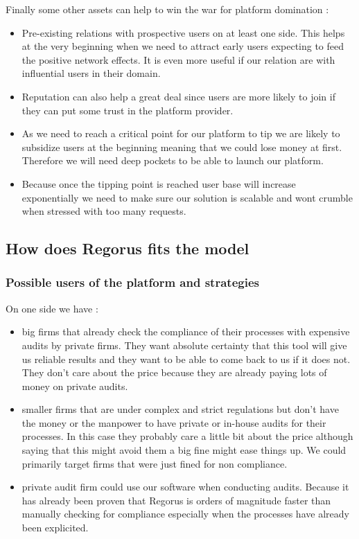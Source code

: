 \documentclass[10pt]{report}
\begin{document}
Finally some other assets can help to win the war for platform domination \autocite{eisenmann2006strategies} :
\begin{itemize}
\item Pre-existing relations with prospective users on at least one side. This helps at the very beginning when we need to attract early users expecting to feed the positive network effects. It is even more useful if our relation are with influential users in their domain.
\item Reputation can also help a great deal since users are more likely to join if they can put some trust in the platform provider.
\item As we need to reach a critical point for our platform to tip we are likely to subsidize users at the beginning meaning that we could lose money at first. Therefore we will need deep pockets to be able to launch our platform.
\item Because once the tipping point is reached user base will increase exponentially we need to make sure our solution is scalable and wont crumble when stressed with too many requests.
\end{itemize}

\subsection{How does Regorus fits the model}

\subsubsection{Possible users of the platform and strategies}
On one side we have :
\begin{itemize}
\item big firms that already check the compliance of their processes with expensive audits by private firms. They want absolute certainty that this tool will give us reliable results and they want to be able to come back to us if it does not. They don't care about the price because they are already paying lots of money on private audits.
\item smaller firms that are under complex and strict regulations but don't have the money or the manpower to have private or in-house audits for their processes. In this case they probably care a little bit about the price although saying that this might avoid them a big fine might ease things up. We could primarily target firms that were just fined for non compliance.
\item private audit firm could use our software when conducting audits. Because it has already been proven that Regorus is orders of magnitude faster than manually checking for compliance especially when the processes have already been explicited.
\end{itemize}
\end{document}
